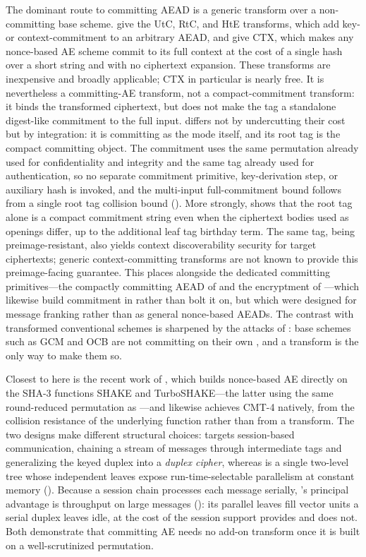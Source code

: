 The dominant route to committing AEAD is a generic transform over a
non-committing base scheme. \cite{BH22} give the \textsf{UtC}, \textsf{RtC}, and
\textsf{HtE} transforms, which add key- or context-commitment to an arbitrary
AEAD, and \cite{CR22} give \textsf{CTX}, which makes any nonce-based AE scheme
commit to its full context at the cost of a single hash over a short string and
with no ciphertext expansion. These transforms are inexpensive and broadly
applicable; \textsf{CTX} in particular is nearly free. It is nevertheless a
committing-AE transform, not a compact-commitment transform: it binds the
transformed ciphertext, but does not make the tag a standalone digest-like
commitment to the full input. \TW{} differs not by undercutting their cost but by
integration: it is committing as the mode itself, and its root tag is the compact
committing object. The commitment uses the same permutation already used for
confidentiality and integrity and the same tag already used for authentication,
so no separate commitment primitive, key-derivation step, or auxiliary hash is
invoked, and the multi-input full-commitment bound follows from a single root tag
collision bound (). More strongly,
 shows that the root tag alone is a compact commitment
string even when the ciphertext bodies used as openings differ, up to the
additional leaf tag birthday term. The same tag, being preimage-resistant,
also yields context discoverability security for target ciphertexts; generic
context-committing transforms are not known to provide this preimage-facing
guarantee. This places \TW{}
alongside the dedicated committing primitives---the compactly committing AEAD of
\cite{GLR17} and the encryptment of \cite{DGRW18}---which likewise build
commitment in rather than bolt it on, but which were designed for message
franking rather than as general nonce-based AEADs. The contrast with transformed
conventional schemes is sharpened by the attacks of : base
schemes such as GCM and OCB are not committing on their own \cite{CR22}, and a
transform is the only way to make them so.

Closest to \TW{} here is the recent work of \cite{DHMVV24}, which builds
nonce-based AE directly on the SHA-3 functions \textsf{SHAKE} and
\textsf{TurboSHAKE}---the latter using the same round-reduced \Keccak{}
permutation as \TW{}---and likewise achieves \textsf{CMT-4} natively, from the
collision resistance of the underlying function rather than from a transform. The
two designs make different structural choices: \cite{DHMVV24} targets
session-based communication, chaining a stream of messages through intermediate
tags and generalizing the keyed duplex into a \emph{duplex cipher}, whereas \TW{}
is a single two-level tree whose independent leaves expose run-time-selectable
parallelism at constant memory (). Because a session
chain processes each message serially, \TW{}'s principal advantage is throughput
on large messages (): its parallel leaves fill vector units
a serial duplex leaves idle, at the cost of the session support \cite{DHMVV24}
provides and \TW{} does not. Both demonstrate
that committing AE needs no add-on transform once it is built on a
well-scrutinized \Keccak{} permutation.

